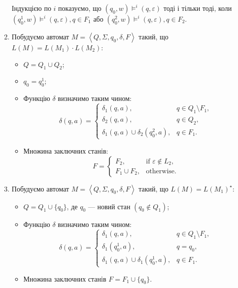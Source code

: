 \begin{enumerate}
	Індукцією по $i$ показуємо, що $(q_0, w) \models^i (q,\varepsilon)$ тоді і тільки тоді, коли $(q_0^1,w) \models^i (q,\varepsilon), q \in F_1$ або $(q_0^2,w) \models^i (q,\varepsilon), q \in F_2$.
	\item Побудуємо автомат $M = \left\langle Q, \Sigma, q_0, \delta, F \right\rangle$ такий, що $L(M) = L(M_1) \cdot L(M_2)$:
	\begin{itemize}
		\item $Q = Q_1 \cup Q_2$;
		\item $q_0 = q_0^1$;
		\item Функцію $\delta$ визначимо таким чином:
		\begin{equation}
			\delta(q, a) = \begin{cases}
				\delta_1(q, a), & q \in Q_1 \setminus F_1, \\
				\delta_2(q, a), & q \in Q_2, \\
				\delta_1(q, a) \cup \delta_2(q_0^2,a), & q \in F_1.
			\end{cases}
		\end{equation}
		\item Множина заключних станів:
		\begin{equation}
			F = \begin{cases}
				F_2, & \text{if } \varepsilon \notin L_2, \\
				F_1 \cup F_2, & \text{otherwise}.
			\end{cases}
		\end{equation}
	\end{itemize}
	\item Побудуємо автомат $M = \left\langle Q, \Sigma, q_0, \delta, F \right\rangle$ такий, що $L(M) = L(M_1)^\star$:
	\begin{itemize}
		\item $Q = Q_1 \cup \{q_0\}$, де $q_0$ --- новий стан $(q_0 \notin Q_1)$;
		\item Функцію $\delta$ визначимо таким чином:
		\begin{equation}
			\delta (q, a) = \begin{cases}
				\delta_1(q, a), & q \in Q_1 \setminus F_1, \\
				\delta_1(q_0^1, a), & q = q_0, \\
				\delta_1(q, a) \cup \delta_1(q_0^1, a), & q \in F_1.
			\end{cases}
		\end{equation}
		\item Множина заключних станів $F = F_1 \cup \{q_0\}$.
	\end{itemize}
\end{enumerate}

